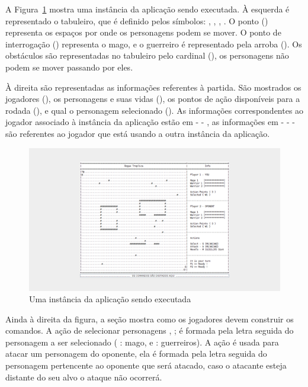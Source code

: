 A Figura~\ref{fig:Tabuleiro} mostra uma instância da aplicação sendo executada. À esquerda é representado o tabuleiro, que é definido pelos símbolos: , , , \srcstyle{\#}. O ponto () representa os espaços por onde os personagens podem se mover. O ponto de interrogação () representa o mago, e o guerreiro é representado pela arroba (). Os obstáculos são representadas no tabuleiro pelo cardinal (\srcstyle{\#}), os personagens não podem se mover passando por eles.

À direita são representadas as informações referentes à partida. São mostrados os jogadores (), os personagens e suas vidas (), os pontos de ação disponíveis para a rodada (), e qual o personagem selecionado (). As informações correspondentes ao jogador associado à instância da aplicação estão em -  - , as informações em -  -  - são referentes ao jogador que está usando a outra instância da aplicação.

\begin{figure}[H]
	\centering
	\includegraphics[trim={9.38cm 2.45cm 9.38cm 2.5cm},clip,scale=0.57]{conteudo/capitulos/figs/tabuleiro.png}
	\caption{Uma instância da aplicação sendo executada}
	\label{fig:Tabuleiro}
\end{figure}

Ainda à direita da figura, a seção  mostra como os jogadores devem construir os comandos. A ação de selecionar personagens , ; é formada pela letra  seguida do personagem a ser selecionado ( : mago,  e : guerreiros). A ação  é usada para atacar um personagem do oponente, ela é formada pela letra  seguida do personagem pertencente ao oponente que será atacado, caso o atacante esteja distante do seu alvo o ataque não ocorrerá. 

